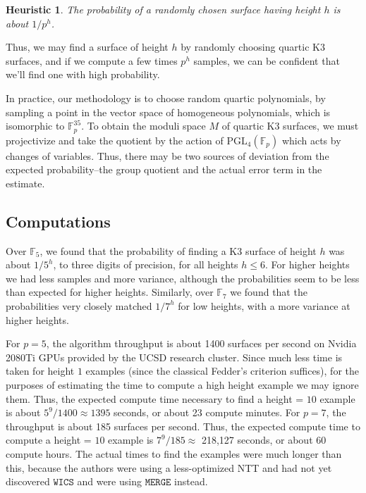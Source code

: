 \documentclass[a4paper]{article}
\newtheorem{heur}[thm]{Heuristic}
\theoremstyle{definition}
\theoremstyle{remark}
\newcommand{\merge}{\texttt{MERGE}}
\newcommand{\wicsalg}{\texttt{WICS}}
\begin{document}
\begin{heur}
The probability of a randomly
chosen surface having height \(h\) is about \(1 / p^{h}\).
\end{heur}

Thus, we may find a surface of height \(h\) by 
randomly choosing quartic K3 surfaces, and 
if we compute a few times \(p^{h}\) 
samples, we can be confident that we'll find
one with high probability.

In practice, our methodology is to choose
random quartic polynomials,
by sampling a point in the vector space
of homogeneous polynomials, which is isomorphic to
\(\mathbb{F}_{p}^{35}\).
To obtain the moduli space \(M\) of quartic K3 surfaces, 
we must projectivize and take the quotient by the action of 
\(\text{PGL}_{4}(\mathbb{F}_{p})\) which acts by changes of variables. 
Thus, there may be two sources of deviation from the expected
probability--the group quotient and the actual 
error term in the estimate.

\subsection{Computations}

Over \(\mathbb{F}_{5}\), we 
found that the probability of finding a K3 surface
of height \(h\) was about \(1 / 5^{h}\), to three digits
of precision, for all heights \(h \leq 6\).
For higher heights we had less samples
and more variance, although
the probabilities seem to be less than expected
for higher heights.
Similarly, over \(\mathbb{F}_{7}\) we found that
the probabilities very closely matched \(1 / 7^{h}\) 
for low heights, with a more variance at higher heights.

For \(p=5\), the algorithm throughput is about
1400 surfaces per second on 
Nvidia 2080Ti GPUs provided by the 
UCSD research cluster.
Since much less time is taken for height \(1\) examples
(since the classical Fedder's criterion suffices), 
for the purposes of estimating the time to compute a
high height example we may ignore them.
Thus,
the expected compute time necessary to find a height = \(10\) 
example is about  \(5^{9} / 1400 \approx 1395\) seconds, or about 
23 compute minutes.
For \(p=7\), the throughput is about 185 surfaces
per second.
Thus, the expected compute time to compute
a height = \(10\) example is 
\(7^{9} / 185 \approx \) 218,127 seconds, or about 
60 compute hours.
The actual times to find the examples were much 
longer than this, because the authors were using a 
less-optimized NTT and had not yet discovered $\wicsalg$
and were using \(\merge\) instead.
\end{document}
